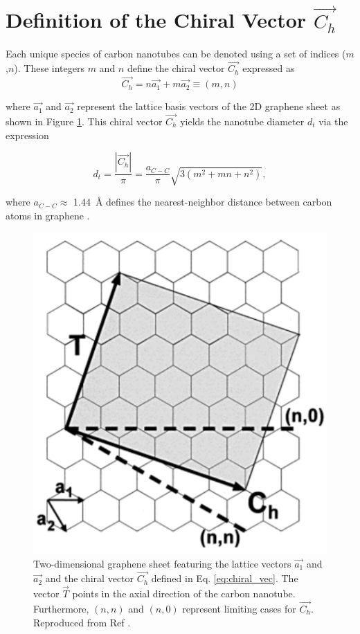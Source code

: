 \section{Definition of the Chiral Vector $\vec{C_h}$}

Each unique species of carbon nanotubes can be	 denoted using a set of indices ($m$,$n$). These integers $m$ and $n$ define the chiral vector $\vec{C_h }$ expressed as 
\begin{equation}
	\vec{C_h} = n {\vec{a_1}} + m {\vec{a_2}} \equiv (m,n)
	\label{eq:chiral_vec}
\end{equation}

where $\vec{a_1}$ and $\vec{a_2}$ represent the lattice basis vectors of the 2D graphene sheet as shown in Figure \ref{fig:chiral_vectors}. This chiral vector $\vec{C_h}$ yields the nanotube diameter $d_t$ via the expression

\begin{equation}
	d_t = \dfrac{|\vec{C_h}|}{\pi} = \dfrac{a_{C-C}}{\pi}\sqrt{3(m^2 + mn + n^2)},
\end{equation} 

where $a_{C-C} \approx$ \SI{1.44}{\angstrom} defines the nearest-neighbor distance between carbon atoms in graphene \cite{nanot2013single}.  

\begin{figure}[ht]
	\centering
	\includegraphics[scale=1]{images/chapter_optical_props/chiral_vectors_sheet.png}
	\caption{Two-dimensional graphene sheet featuring the lattice vectors $\vec{a_1}$ and $\vec{a_2}$ and the chiral vector $\vec{C_h}$ defined in Eq. \ref{eq:chiral_vec}. The vector $\vec{T}$ points in the axial direction of the carbon nanotube. Furthermore, $(n,n)$ and $(n,0)$ represent limiting cases for $\vec{C_h }$. Reproduced from Ref \cite{odom2000structure}.}
	\label{fig:chiral_vectors}
\end{figure}




